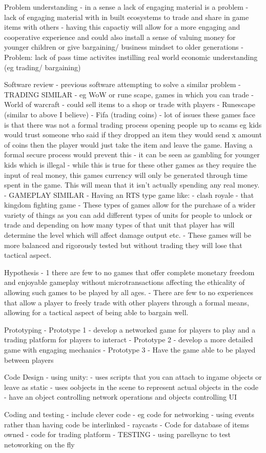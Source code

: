 Problem understanding
 - in a sense a lack of engaging material is a problem
 - lack of engaging material with in built ecosystems to trade and share in game items with others
 - having this capactiy will allow for a more engaging and cooperative experience and could also install 
 a sense of valuing money for younger children or give bargaining/ business mindset to older generations
 - Problem: lack of pass time activites instilling real world economic understanding (eg trading/ bargaining)

Software review 
 - previous software attempting to solve a similar problem
 - TRADING SIMILAR
 - eg WoW or rune scape, games in which you can trade
 - World of warcraft - could sell items to a shop or trade with players
 - Runescape (similar to above I believe)
 - Fifa (trading coins)
 - lot of issues these games face is that there was not a formal trading process opening people up to scams
 eg kids would trust someone who said if they dropped an item they would send x amount of coins then the player
 would just take the item and leave the game. Having a formal secure process would prevent this
 - it can be seen as gambling for younger kids which is illegal - while this is true for these other games
 as they require the input of real money, this games currency will only be generated through time spent in the game. 
 This will mean that it isn't actually spending any real money.
 - GAMEPLAY SIMILAR
 - Having an RTS type game like:
 - clash royale
 - that kingdom fighting game
 - These types of games allow for the purchase of a wider variety of things as you can add different types of units
 for people to unlock or trade and depending on how many types of that unit that player has will determine the level 
 which will affect damage output etc. 
 - These games will be more balanced and rigorously tested but without trading they will lose that tactical aspect.

Hypothesis 
 - 1 there are few to no games that offer complete monetary freedom and enjoyable gameplay without 
 microtransactions affecting the ethicality of allowing such games to be played by all ages.
 - There are few to no experiences that allow a player to freely trade with other players through a formal means, 
 allowing for a tactical aspect of being able to bargain well.

Prototyping 
 - Prototype 1 - develop a networked game for players to play and a trading platform for players to interact
 - Prototype 2 - develop a more detailed game with engaging mechanics
 - Prototype 3 - Have the game able to be played between players

Code Design
 - using unity:
    - uses scripts that you can attach to ingame objects or leave as static
    - uses oobjects in the scene to represent actual objects in the code
    - have an object controlling network operations and objects controlling UI

Coding and testing 
 - include clever code
 - eg code for networking
 - using events rather than having code be interlinked
 - raycasts
 - Code for database of items owned
 - code for trading platform
 - TESTING
  - using parellsync to test netoworking on the fly
